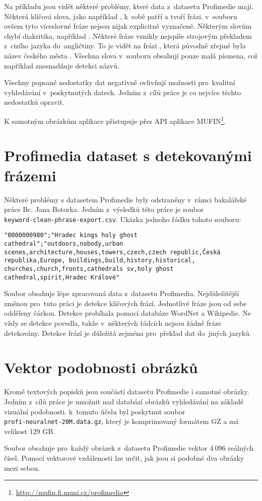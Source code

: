 Na příkladu jsou vidět některé problémy, které data z~datasetu Profimedie mají. Některá klíčová slova, jako například , k~sobě patří a tvoří frázi. v~souboru ovšem tyto víceslovné fráze nejsou nijak explicitně vyznačené. Některým slovům chybí diakritika, například . Některé fráze vznikly nejspíše strojovým překladem z~cizího jazyka do~angličtiny. To je vidět na frázi , která původně zřejmě byla název českého města . Všechna slova v~souboru obsahují pouze malá písmena, což například znesnadňuje detekci názvů.

Všechny popsané nedostatky dat negativně ovlivňují možnosti pro~kvalitní vyhledávání v~poskytnutých datech. Jedním z~cílů práce je co nejvíce těchto nedostatků opravit.

K samotným obrázkům aplikace přistupuje přes API aplikace MUFIN\footnote{\url{http://mufin.fi.muni.cz/profimedia}}. 

\section{Profimedia dataset s detekovanými frázemi}

Některé problémy s datasetem Profimedie byly odstraněny v~rámci bakalářské práce Bc. Jana Botorka\cite{botorek}. Jedním z~výsledků této práce je soubor\\\lstinline{keyword-clean-phrase-export.csv}. Ukázka jednoho řádku tohoto souboru:

\begin{lstlisting}
"0000000980";"Hradec kings holy ghost cathedral";"outdoors,nobody,urban scenes,architecture,houses,towers,czech,czech republic,Česká republika,Europe, buildings,build,history,historical, churches,church,fronts,cathedrals sv,holy ghost cathedral,spirit,Hradec Králové"
\end{lstlisting}

Soubor obsahuje lépe zpracovaná data z~datasetu Profimedia. Nejdůležitější změnou pro~tuto práci je detekce klíčových frází. Jednotlivé fráze jsou od sebe odděleny čárkou. Detekce probíhala pomocí databáze WordNet\cite{wordnet} a Wikipedie\cite{wiki}. Ne vždy se detekce povedla, takže v~některých řádcích nejsou žádné fráze detekovány. Detekce frází je důležitá zejména pro~překlad dat do~jiných jazyků.

\section{Vektor podobnosti obrázků}

Kromě textových popisků jsou součástí datasetu Profimedie i samotné obrázky. Jedním z~cílů práce je umožnit nad databází obrázků vyhledávání na základě vizuální podobnosti. k~tomuto účelu byl poskytnut soubor\\\lstinline{profi-neuralnet-20M.data.gz}, který je komprimovaný formátem GZ a má velikost 129 GB.

Soubor obsahuje pro~každý obrázek z~datasetu Profimedie vektor $4\ 096$ reálných čísel. Pomocí vektorové vzdálenosti lze určit, jak jsou si podobné dva obrázky mezi sebou.


